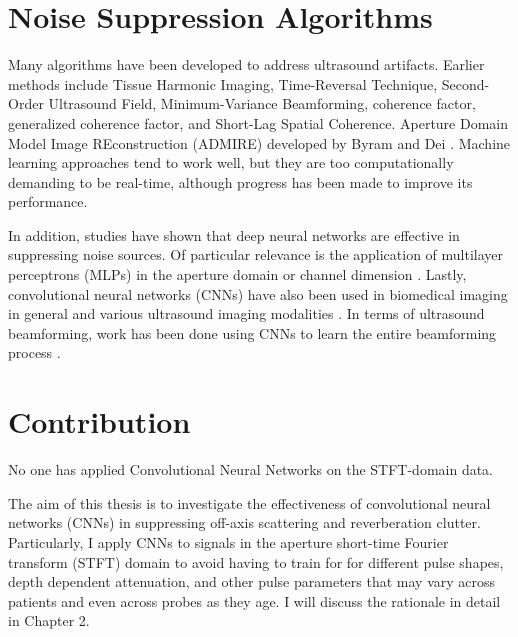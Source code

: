 


\section{Noise Suppression Algorithms}

Many algorithms have been developed to address ultrasound artifacts. Earlier methods include Tissue Harmonic Imaging, Time-Reversal Technique, Second-Order Ultrasound Field, Minimum-Variance Beamforming, coherence factor, generalized coherence factor, and Short-Lag Spatial Coherence\cite{slsc}. Aperture Domain Model Image REconstruction (ADMIRE) developed by Byram and Dei \cite{admire2015}. Machine learning approaches tend to work well, but they are too computationally demanding to be real-time, although progress has been made to improve its performance.

In addition, studies have shown that deep neural networks are effective in suppressing noise sources. Of particular relevance is the application of multilayer perceptrons (MLPs) in the aperture domain or channel dimension \cite{luchies_tmi_2018}. Lastly, convolutional neural networks (CNNs) have also been used in biomedical imaging in general \cite{unet} and various ultrasound imaging modalities \cite{van_sloun_review}. In terms of ultrasound beamforming, work has been done using CNNs to learn the entire beamforming process \cite{hyun_uffc_2019}.



\section{Contribution} %
No one has applied Convolutional Neural Networks on the STFT-domain data.

The aim of this thesis is to investigate the effectiveness of convolutional neural networks (CNNs) in suppressing off-axis scattering and reverberation clutter. Particularly, I apply CNNs to signals in the aperture short-time Fourier transform (STFT) domain to avoid having to train for for different pulse shapes, depth dependent attenuation, and other pulse parameters that may vary across patients and even across probes as they age. I will discuss the rationale in detail in Chapter 2.

